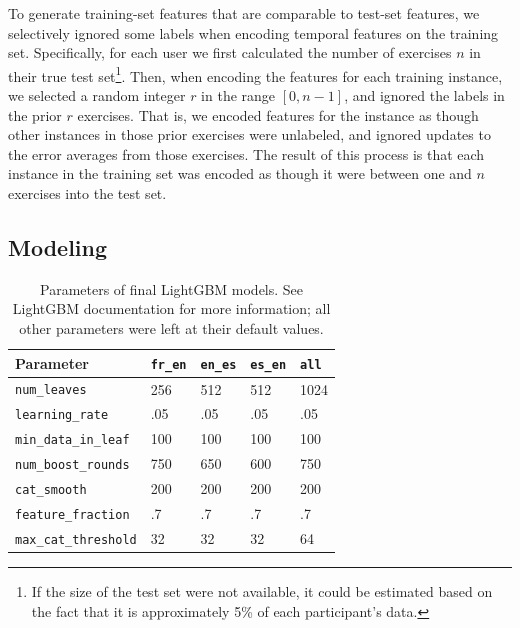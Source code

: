 \documentclass[11pt,a4paper]{article}
\begin{document}
To generate training-set features that are 
comparable to test-set features, we selectively ignored some labels when encoding temporal features on
the training set. Specifically, for each user we first calculated the number of
exercises $n$ in their true test set\footnote{If the size of the test set were
  not available, it could be estimated based on the fact that it is
  approximately 5\% of each participant's data.}. Then, when encoding the features for each
training instance, we selected a random integer $r$ in the range $[0,n-1]$, and
ignored the labels in the prior $r$ exercises. That is, we encoded features for the instance
as though other instances in those prior exercises were unlabeled, and ignored
updates to the error averages from those exercises. The result of this process
is that each instance in the training set was encoded as though it were between
one and $n$ exercises into the test set.

\subsection{Modeling}

\begin{table}[t!]
\small
\begin{center}
\begin{tabular}{|l|llll|}
  \hline \bf Parameter & {\tt fr\_en} & {\tt en\_es} & {\tt es\_en} & {\tt all} \\ \hline
  {\tt num\_leaves} & 256 & 512 & 512 & 1024 \\
  {\tt learning\_rate} & .05 & .05 & .05 & .05 \\
  {\tt min\_data\_in\_leaf} & 100 & 100 & 100 & 100 \\
  {\tt num\_boost\_rounds} & 750 & 650 & 600 & 750 \\
  {\tt cat\_smooth} & 200 & 200 & 200& 200 \\
  {\tt feature\_fraction} & .7 & .7 & .7 & .7 \\
  {\tt max\_cat\_threshold} & 32 & 32 & 32& 64 \\
\hline
\end{tabular}
\end{center}
\caption{\label{lightgbm-params} Parameters of final LightGBM models. See
  LightGBM documentation for more information; all other parameters were left at
their default values.}
\end{table}
\end{document}
